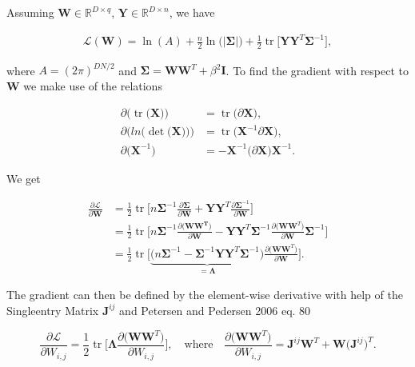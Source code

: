 \documentclass[a4paper]{article}
\DeclareMathOperator{\tr}{tr}
\begin{document}
\noindent\makebox[\linewidth]{\rule{\textwidth}{0.4pt}}
\hfil

\noindent Assuming $\mathbf{W}\in\mathbb{R}^{D\times q}$, $\mathbf{Y}\in\mathbb{R}^{D\times n}$, we have

\begin{align*}
\mathcal{L}(\mathbf{W})=\ln(A)+\frac{n}{2}\ln\bigg(\vert\mathbf{\Sigma}\vert\bigg)+\frac{1}{2}\tr\bigg[\mathbf{Y}\mathbf{Y}^T\mathbf{\Sigma}^{-1}\bigg],
\end{align*}

\noindent where $A=(2\pi)^{DN/2}$ and $\mathbf{\Sigma}=\mathbf{WW}^T+\beta^2\mathbf{I}$. To find the gradient with respect to $\mathbf{W}$ we make use of the relations

\begin{align*}
\partial\big(\tr\big(\mathbf{X}\big)\big)&=\tr\big(\partial\mathbf{X}\big),\\
\partial\big(ln\big(\det\big(\mathbf{X}\big)\big)\big)&=\tr\big(\mathbf{X}^{-1}\partial\mathbf{X}\big),\\
\partial\big(\mathbf{X}^{-1}\big)&=-\mathbf{X}^{-1}\big(\partial\mathbf{X}\big)\mathbf{X}^{-1}.
\end{align*}

\noindent We get

\begin{align*}
\frac{\partial\mathcal{L}}{\partial\mathbf{W}}&=\frac{1}{2}\tr\bigg[n\mathbf{\Sigma}^{-1}\frac{\partial\mathbf{\Sigma}}{\partial\mathbf{W}}+\mathbf{Y}\mathbf{Y}^T\frac{\partial\mathbf{\Sigma}^{-1}}{\partial\mathbf{W}}\bigg] \\&= \frac{1}{2}\tr\bigg[n\mathbf{\Sigma}^{-1}\frac{\partial\mathbf{\big(\mathbf{WW}^T\big)}}{\partial\mathbf{W}}-\mathbf{Y}\mathbf{Y}^T\mathbf{\Sigma}^{-1}\frac{\partial\big(\mathbf{WW}^T\big)}{\partial\mathbf{W}}\mathbf{\Sigma}^{-1}\bigg]\\&=\frac{1}{2}\tr\bigg[\underbrace{\bigg(n\mathbf{\Sigma}^{-1}-\mathbf{\Sigma}^{-1}\mathbf{Y}\mathbf{Y}^T\mathbf{\Sigma}^{-1}\bigg)}_{=\mathbf{\Lambda}}\frac{\partial\big(\mathbf{WW}^T\big)}{\partial\mathbf{W}}\bigg].
\end{align*}

\noindent The gradient can then be defined by the element-wise derivative with help of the Singleentry Matrix $\mathbf{J}^{ij}$ and Petersen and Pedersen 2006 eq. 80

\begin{equation*}
\frac{\partial \mathcal{L}}{\partial W_{i,j}}=\frac{1}{2}\tr\bigg[\mathbf{\Lambda}\frac{\partial\big(\mathbf{WW}^T\big)}{\partial W_{i,j}}\bigg],\quad\text{where}\quad\frac{\partial\big(\mathbf{WW}^T\big)}{\partial W_{i,j}}=\mathbf{J}^{ij}\mathbf{W}^T+\mathbf{W}\big(\mathbf{J}^{ij}\big)^T.
\end{equation*} 
\end{document}
